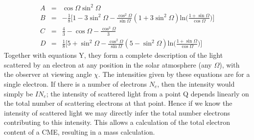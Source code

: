 \begin{eqnarray}
A &=& \cos \Omega \sin^2 \Omega \\
%
B &=& -\frac{1}{8}\bigg[1 - 3\sin^2\Omega -\frac{\cos^2\Omega}{\sin\Omega}(1+3\sin^2\Omega)\textrm{ln}\bigg(\frac{1+\sin\Omega}{\cos\Omega}\bigg)\bigg] \\
%
C &=& \frac{4}{3} - \cos\Omega - \frac{\cos^3\Omega}{3} \\
D &=& \frac{1}{8}\bigg[5 + \sin^2\Omega -\frac{\cos^2\Omega}{\sin\Omega}(5-\sin^2\Omega)\textrm{ln}\bigg(\frac{1+\sin\Omega}{\cos\Omega}\bigg)\bigg] 
\end{eqnarray}
Together with equations Y, they form a complete description of the light scattered by an electron at any position in the solar atmosphere (any $\Omega$), with the observer at viewing angle $\chi$. The intensities given by these equations are for a single electron. If there is a number of electrons $N_e$, then the intensity would simply be $IN_e$; the intensity of scattered light from a point Q depends linearly on the total number of scattering electrons at that point. Hence if we know the intensity of scattered light we may directly infer the total number electrons contributing to this intensity. This allows a calculation of the total electron content of a CME, resulting in a mass calculation.









